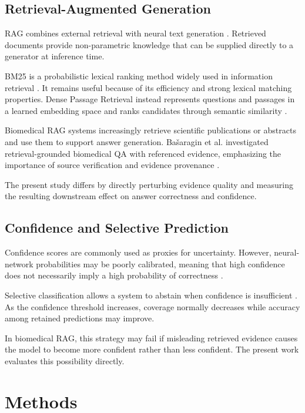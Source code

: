 \documentclass[conference]{IEEEtran}
\begin{document}
\subsection{Retrieval-Augmented Generation}

RAG combines external retrieval with neural text generation \cite{lewis2020rag}. Retrieved documents provide non-parametric knowledge that can be supplied directly to a generator at inference time.

BM25 is a probabilistic lexical ranking method widely used in information retrieval \cite{robertson2009bm25}. It remains useful because of its efficiency and strong lexical matching properties. Dense Passage Retrieval instead represents questions and passages in a learned embedding space and ranks candidates through semantic similarity \cite{karpukhin2020dpr}.

Biomedical RAG systems increasingly retrieve scientific publications or abstracts and use them to support answer generation. Bašaragin et al. investigated retrieval-grounded biomedical QA with referenced evidence, emphasizing the importance of source verification and evidence provenance \cite{basaragin2024biomedicalrag}.

The present study differs by directly perturbing evidence quality and measuring the resulting downstream effect on answer correctness and confidence.

\subsection{Confidence and Selective Prediction}

Confidence scores are commonly used as proxies for uncertainty. However, neural-network probabilities may be poorly calibrated, meaning that high confidence does not necessarily imply a high probability of correctness \cite{guo2017calibration}.

Selective classification allows a system to abstain when confidence is insufficient \cite{geifman2017selective}. As the confidence threshold increases, coverage normally decreases while accuracy among retained predictions may improve.

In biomedical RAG, this strategy may fail if misleading retrieved evidence causes the model to become more confident rather than less confident. The present work evaluates this possibility directly.

\section{Methods}
\end{document}
